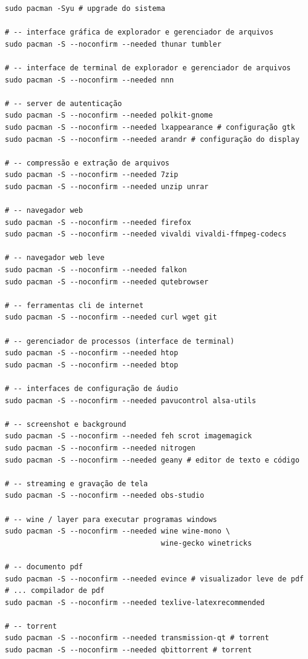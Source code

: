 \documentclass[12pt,a4paper]{article}
\begin{document}
\begin{lstlisting}
sudo pacman -Syu # upgrade do sistema 

# -- interface gráfica de explorador e gerenciador de arquivos 
sudo pacman -S --noconfirm --needed thunar tumbler 

# -- interface de terminal de explorador e gerenciador de arquivos 
sudo pacman -S --noconfirm --needed nnn 

# -- server de autenticação
sudo pacman -S --noconfirm --needed polkit-gnome 
sudo pacman -S --noconfirm --needed lxappearance # configuração gtk
sudo pacman -S --noconfirm --needed arandr # configuração do display

# -- compressão e extração de arquivos
sudo pacman -S --noconfirm --needed 7zip 
sudo pacman -S --noconfirm --needed unzip unrar 

# -- navegador web
sudo pacman -S --noconfirm --needed firefox 
sudo pacman -S --noconfirm --needed vivaldi vivaldi-ffmpeg-codecs

# -- navegador web leve 
sudo pacman -S --noconfirm --needed falkon 
sudo pacman -S --noconfirm --needed qutebrowser

# -- ferramentas cli de internet 
sudo pacman -S --noconfirm --needed curl wget git 

# -- gerenciador de processos (interface de terminal)
sudo pacman -S --noconfirm --needed htop 
sudo pacman -S --noconfirm --needed btop 

# -- interfaces de configuração de áudio 
sudo pacman -S --noconfirm --needed pavucontrol alsa-utils 

# -- screenshot e background 
sudo pacman -S --noconfirm --needed feh scrot imagemagick 
sudo pacman -S --noconfirm --needed nitrogen 
sudo pacman -S --noconfirm --needed geany # editor de texto e código

# -- streaming e gravação de tela 
sudo pacman -S --noconfirm --needed obs-studio 

# -- wine / layer para executar programas windows
sudo pacman -S --noconfirm --needed wine wine-mono \
                                    wine-gecko winetricks 

# -- documento pdf                                    
sudo pacman -S --noconfirm --needed evince # visualizador leve de pdf 
# ... compilador de pdf 
sudo pacman -S --noconfirm --needed texlive-latexrecommended 

# -- torrent 
sudo pacman -S --noconfirm --needed transmission-qt # torrent
sudo pacman -S --noconfirm --needed qbittorrent # torrent


\end{lstlisting}
\end{document}
